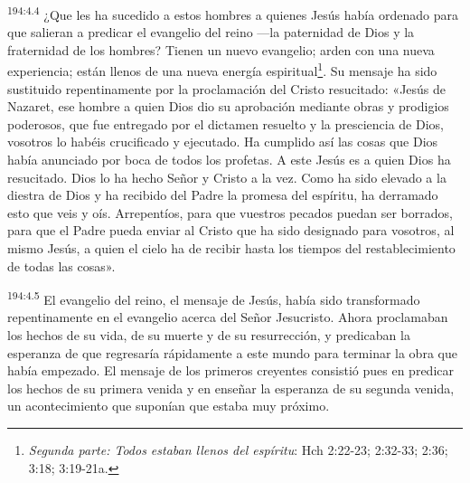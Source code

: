 \par
\textsuperscript{194:4.4} ¿Que les ha sucedido a estos hombres a quienes Jesús había ordenado para que salieran a predicar el evangelio del reino ---la paternidad de Dios y la fraternidad de los hombres? Tienen un nuevo evangelio; arden con una nueva experiencia; están llenos de una nueva energía espiritual\footnote{\textit{Segunda parte: Todos estaban llenos del espíritu}: Hch 2:22-23; 2:32-33; 2:36; 3:18; 3:19-21a.}. Su mensaje ha sido sustituido repentinamente por la proclamación del Cristo resucitado: «Jesús de Nazaret, ese hombre a quien Dios dio su aprobación mediante obras y prodigios poderosos, que fue entregado por el dictamen resuelto y la presciencia de Dios, vosotros lo habéis crucificado y ejecutado. Ha cumplido así las cosas que Dios había anunciado por boca de todos los profetas. A este Jesús es a quien Dios ha resucitado. Dios lo ha hecho Señor y Cristo a la vez. Como ha sido elevado a la diestra de Dios y ha recibido del Padre la promesa del espíritu, ha derramado esto que veis y oís. Arrepentíos, para que vuestros pecados puedan ser borrados, para que el Padre pueda enviar al Cristo que ha sido designado para vosotros, al mismo Jesús, a quien el cielo ha de recibir hasta los tiempos del restablecimiento de todas las cosas».

\par
\textsuperscript{194:4.5} El evangelio del reino, el mensaje de Jesús, había sido transformado repentinamente en el evangelio acerca del Señor Jesucristo. Ahora proclamaban los hechos de su vida, de su muerte y de su resurrección, y predicaban la esperanza de que regresaría rápidamente a este mundo para terminar la obra que había empezado. El mensaje de los primeros creyentes consistió pues en predicar los hechos de su primera venida y en enseñar la esperanza de su segunda venida, un acontecimiento que suponían que estaba muy próximo.

